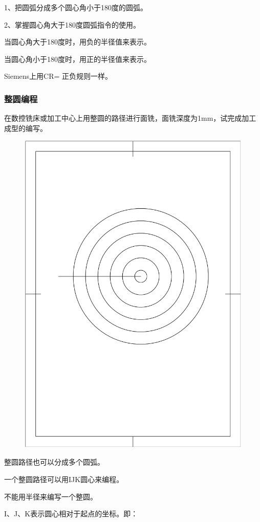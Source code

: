 1、把圆弧分成多个圆心角小于180度的圆弧。

2、掌握圆心角大于180度圆弧指令的使用。

当圆心角大于180度时，用负的半径值来表示。

当圆心角小于180度时，用正的半径值来表示。

Siemens上用CR= 正负规则一样。



\subsubsection{整圆编程}
在数控铣床或加工中心上用整圆的路径进行面铣，面铣深度为1mm，试完成加工成型的编写。
\begin{figure}[h]
    \centering
    \includegraphics[width=0.8\linewidth,trim=50 150 50 100,clip]{data/image/5-3.jpg}
    \caption{}
    \label{fig:5-3}
\end{figure}

整圆路径也可以分成多个圆弧。

一个整圆路径可以用IJK圆心来编程。

不能用半径来编写一个整圆。


I、J、K表示圆心相对于起点的坐标。即：

